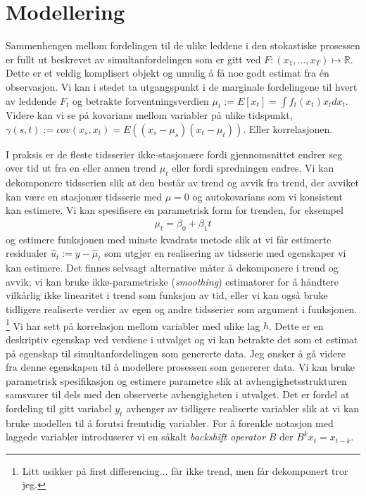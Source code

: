 \section{Modellering}
Sammenhengen mellom fordelingen til de ulike leddene i den stokastiske prosessen er fullt ut beskrevet av simultanfordelingen som er gitt ved $F:(x_1,\dots, x_T)\mapsto \mathbb{R}$. Dette er et veldig komplisert objekt og umulig å få noe godt estimat fra én observasjon. Vi kan i stedet ta utgangspunkt i de marginale fordelingene til hvert av leddende $F_t$ og betrakte forventningsverdien $\mu_t := E[x_t]=\int f_t(x_t)x_tdx_t$. Videre kan vi se på kovarians mellom variabler på ulike tidspunkt, $\gamma(s,t):=cov(x_s,x_t)=E((x_s-\mu_s)(x_t-\mu_t))$. Eller korrelasjonen. 


I praksis er de fleste tidsserier ikke-stasjonære fordi gjennomsnittet endrer seg over tid ut fra en eller annen trend $\mu_t$ eller fordi spredningen endres. Vi kan dekomponere tidsserien slik at den består av trend og avvik fra trend, der avviket kan være en stasjonær tidsserie med $\mu=0$ og autokovarians som vi konsistent kan estimere. Vi kan spesifisere en parametrisk form for trenden, for eksempel
\begin{align}
\mu_t = \beta_0 + \beta_1 t
\end{align}
og estimere funksjonen med minste kvadrats metode slik at vi får estimerte residualer $\hat{u}_t := y-\hat{\mu}_t$ som utgjør en realisering av tidsserie med egenskaper vi kan estimere. Det finnes selvsagt alternative måter å dekomponere i trend og avvik; vi kan bruke ikke-parametriske (\textit{smoothing}) estimatorer for å håndtere vilkårlig ikke linearitet i trend som funksjon av tid, eller vi kan også bruke tidligere realiserte verdier av egen og andre tidsserier som argument i funksjonen. \footnote{Litt usikker på first differencing... får ikke trend, men får dekomponert tror jeg.}
Vi har sett på korrelasjon mellom variabler med ulike lag $h$. Dette er en deskriptiv egenskap ved verdiene i utvalget og vi kan betrakte det som et estimat på egenskap til simultanfordelingen som genererte data. Jeg ønsker å gå videre fra denne egenskapen til å modellere prosessen som genererer data. Vi kan bruke parametrisk spesifikasjon og estimere parametre slik at avhengighetsstrukturen samsvarer til dels med den observerte avhengigheten i utvalget. Det er fordel at fordeling til gitt variabel $y_t$ avhenger av tidligere realiserte variabler slik at vi kan bruke modellen til å forutsi fremtidig variabler. For å forenkle notasjon med laggede variabler introduserer vi en såkalt \textit{backshift operator} $B$ der $B^k x_t = x_{t-k}$.
